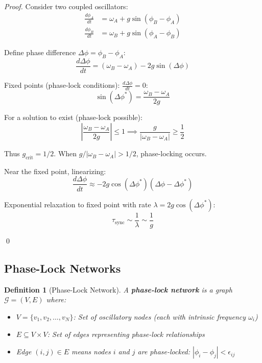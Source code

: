 \documentclass[12pt,a4paper]{article}
\newtheorem{definition}{Definition}
\begin{document}
\begin{proof}
Consider two coupled oscillators:
\begin{align}
\frac{d\phi_A}{dt} &= \omega_A + g \sin(\phi_B - \phi_A) \\
\frac{d\phi_B}{dt} &= \omega_B + g \sin(\phi_A - \phi_B)
\end{align}

Define phase difference $\Delta\phi = \phi_B - \phi_A$:
\begin{equation}
\frac{d\Delta\phi}{dt} = (\omega_B - \omega_A) - 2g \sin(\Delta\phi)
\end{equation}

Fixed points (phase-lock conditions): $\frac{d\Delta\phi}{dt} = 0$:
\begin{equation}
\sin(\Delta\phi^*) = \frac{\omega_B - \omega_A}{2g}
\end{equation}

For a solution to exist (phase-lock possible):
\begin{equation}
\left|\frac{\omega_B - \omega_A}{2g}\right| \leq 1 \implies \frac{g}{|\omega_B - \omega_A|} \geq \frac{1}{2}
\end{equation}

Thus $g_{\text{crit}} = 1/2$. When $g/|\omega_B - \omega_A| > 1/2$, phase-locking occurs.

Near the fixed point, linearizing:
\begin{equation}
\frac{d\Delta\phi}{dt} \approx -2g \cos(\Delta\phi^*) (\Delta\phi - \Delta\phi^*)
\end{equation}

Exponential relaxation to fixed point with rate $\lambda = 2g \cos(\Delta\phi^*)$:
\begin{equation}
\tau_{\text{sync}} \sim \frac{1}{\lambda} \sim \frac{1}{g}
\end{equation}

\qed
\end{proof}

\subsection{Phase-Lock Networks}

\begin{definition}[Phase-Lock Network]
\label{def:phase_lock_network}
A \textbf{phase-lock network} is a graph $\mathcal{G} = (V, E)$ where:
\begin{itemize}
\item $V = \{v_1, v_2, \ldots, v_N\}$: Set of oscillatory nodes (each with intrinsic frequency $\omega_i$)
\item $E \subseteq V \times V$: Set of edges representing phase-lock relationships
\item Edge $(i,j) \in E$ means nodes $i$ and $j$ are phase-locked: $|\phi_i - \phi_j| < \epsilon_{ij}$
\end{itemize}
\end{definition}
\end{document}
